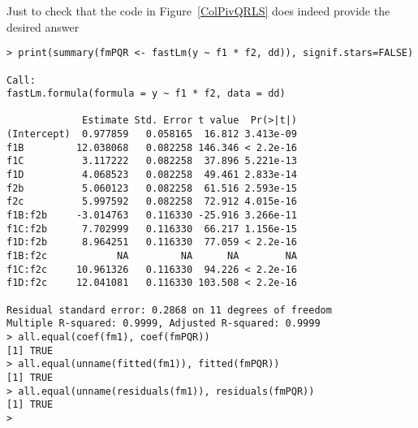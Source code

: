 \documentclass[shortnames,article]{jss}
\begin{document}

Just to check that the code in Figure~\ref{ColPivQRLS} does indeed provide the desired answer

\begin{verbatim}
> print(summary(fmPQR <- fastLm(y ~ f1 * f2, dd)), signif.stars=FALSE)

Call:
fastLm.formula(formula = y ~ f1 * f2, data = dd)

             Estimate Std. Error t value  Pr(>|t|)
(Intercept)  0.977859   0.058165  16.812 3.413e-09
f1B         12.038068   0.082258 146.346 < 2.2e-16
f1C          3.117222   0.082258  37.896 5.221e-13
f1D          4.068523   0.082258  49.461 2.833e-14
f2b          5.060123   0.082258  61.516 2.593e-15
f2c          5.997592   0.082258  72.912 4.015e-16
f1B:f2b     -3.014763   0.116330 -25.916 3.266e-11
f1C:f2b      7.702999   0.116330  66.217 1.156e-15
f1D:f2b      8.964251   0.116330  77.059 < 2.2e-16
f1B:f2c            NA         NA      NA        NA
f1C:f2c     10.961326   0.116330  94.226 < 2.2e-16
f1D:f2c     12.041081   0.116330 103.508 < 2.2e-16

Residual standard error: 0.2868 on 11 degrees of freedom
Multiple R-squared: 0.9999,	Adjusted R-squared: 0.9999
> all.equal(coef(fm1), coef(fmPQR))
[1] TRUE
> all.equal(unname(fitted(fm1)), fitted(fmPQR))
[1] TRUE
> all.equal(unname(residuals(fm1)), residuals(fmPQR))
[1] TRUE
> 
\end{verbatim}
\end{document}
